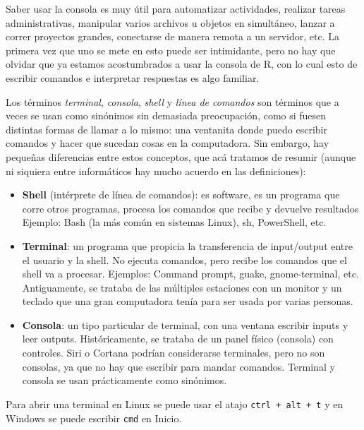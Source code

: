 \documentclass[
]{book}
\providecommand{\tightlist}{%
  \setlength{\itemsep}{0pt}\setlength{\parskip}{0pt}}
\begin{document}
Saber usar la consola es muy útil para automatizar actividades, realizar tareas administrativas, manipular varios archivos u objetos en simultáneo, lanzar a correr proyectos grandes, conectarse de manera remota a un servidor, etc. La primera vez que uno se mete en esto puede ser intimidante, pero no hay que olvidar que ya estamos acostumbrados a usar la consola de R, con lo cual esto de escribir comandos e interpretar respuestas es algo familiar.

Los términos \emph{terminal}, \emph{consola}, \emph{shell} y \emph{línea de comandos} son términos que a veces se usan como sinónimos sin demasiada preocupación, como si fuesen distintas formas de llamar a lo mismo: una ventanita donde puedo escribir comandos y hacer que sucedan cosas en la computadora. Sin embargo, hay pequeñas diferencias entre estos conceptos, que acá tratamos de resumir (aunque ni siquiera entre informáticos hay mucho acuerdo en las definiciones):

\begin{itemize}
\tightlist
\item
  \textbf{Shell} (intérprete de línea de comandos): es software, es un programa que corre otros programas, procesa los comandos que recibe y devuelve resultados Ejemplo: Bash (la más común en sistemas Linux), sh, PowerShell, etc.
\item
  \textbf{Terminal}: un programa que propicia la transferencia de input/output entre el usuario y la shell. No ejecuta comandos, pero recibe los comandos que el shell va a procesar. Ejemplos: Command prompt, guake, gnome-terminal, etc. Antiguamente, se trataba de las múltiples estaciones con un monitor y un teclado que una gran computadora tenía para ser usada por varias personas.
\item
  \textbf{Consola}: un tipo particular de terminal, con una ventana escribir inputs y leer outputs. Históricamente, se trataba de un panel físico (consola) con controles. Siri o Cortana podrían considerarse terminales, pero no son consolas, ya que no hay que escribir para mandar comandos. Terminal y consola se usan prácticamente como sinónimos.
\end{itemize}

Para abrir una terminal en Linux se puede usar el atajo \texttt{ctrl\ +\ alt\ +\ t} y en Windows se puede escribir \texttt{cmd} en Inicio.
\end{document}

